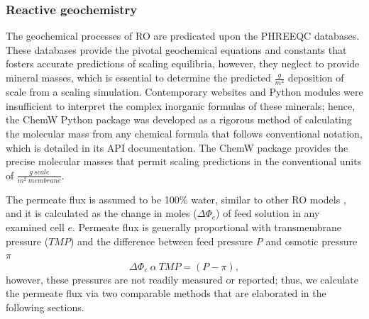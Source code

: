 \subsubsection{Reactive geochemistry}
The geochemical processes of RO are predicated upon the PHREEQC databases. These databases provide the pivotal geochemical equations and constants that fosters accurate predictions of scaling equilibria, however, they neglect to provide mineral masses, which is essential to determine the predicted $\frac{g}{m^2}$ deposition of scale from a scaling simulation. Contemporary websites and Python modules were insufficient to interpret the complex inorganic formulas of these minerals; hence, the ChemW Python package was developed as a rigorous method of calculating the molecular mass from any chemical formula that follows conventional notation, which is detailed in its API documentation. The ChemW package provides the precise molecular masses that permit scaling predictions in the conventional units of $\frac{g~scale}{m^2~membrane}$. 

The permeate flux is assumed to be 100\% water, similar to other RO models \cite{Li2012OptimalDesalination}, and it is calculated as the change in moles ($\Delta \Phi_{e}$) of feed solution in any examined cell $e$. Permeate flux is generally proportional with transmembrane pressure ($TMP$) and the difference between feed pressure $P$ and osmotic pressure $\pi$ \cite{VanWagner2009EffectPerformance,Schock1987MassModules,Lonsdale1965TransportMembranes}
\begin{equation} \label{pressure_differential}
    \Delta \Phi_{e} ~ \alpha ~ TMP = (P - \pi),
\end{equation} 
however, these pressures are not readily measured or reported; thus, we calculate the permeate flux via two comparable methods that are elaborated in the following sections.

